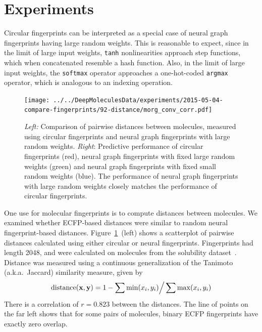 \documentclass{article}
\newcommand{\citet}{\cite}
\newcommand{\vx}{\mathbf{x}}
\newcommand{\vy}{\mathbf{y}}
\begin{document}
\section{Experiments}
\label{sec:experiments}

\label{sec:random is equivalent}
Circular fingerprints can be interpreted as a special case of neural graph fingerprints having large random weights.
This is reasonable to expect, since in the limit of large input weights, \texttt{tanh} nonlinearities approach step functions, which when concatenated resemble a hash function.
Also, in the limit of large input weights, the \texttt{softmax} operator approaches a one-hot-coded \texttt{argmax} operator, which is analogous to an indexing operation.

\begin{figure}[h]
\texttt{[image: ../../DeepMoleculesData/experiments/2015-05-04-compare-fingerprints/92-distance/morg\_conv\_corr.pdf]}
\caption{\emph{Left:} Comparison of pairwise distances between molecules, measured using circular fingerprints and neural graph fingerprints with large random weights.
\emph{Right}: Predictive performance of circular fingerprints (red), neural graph fingerprints with fixed large random weights (green) and neural graph fingerprints with fixed small random weights (blue).
The performance of neural graph fingerprints with large random weights closely matches the performance of circular fingerprints.}
\label{fig:fingerprint similarity}
\end{figure}

One use for molecular fingerprints is to compute distances between molecules.
We examined whether ECFP-based distances were similar to random neural fingerprint-based distances.
Figure~\ref{fig:fingerprint similarity}~(left) shows a scatterplot of pairwise distances calculated using either  circular or neural fingerprints.
Fingerprints had length 2048, and were calculated on molecules from the solubility dataset~\citet{delaney_data_2004}.
Distance was measured using a continuous generalization of the Tanimoto (a.k.a.\ Jaccard) similarity measure, given by
\begin{equation}
\textnormal{distance}(\vx, \vy) = 1 - \sum \min(x_i, y_i) \Big/ \sum \max(x_i, y_i)
\end{equation}
There is a correlation of $r = 0.823$ between the distances.
The line of points on the far left shows that for some pairs of molecules, binary ECFP fingerprints have exactly zero overlap.
\end{document}
